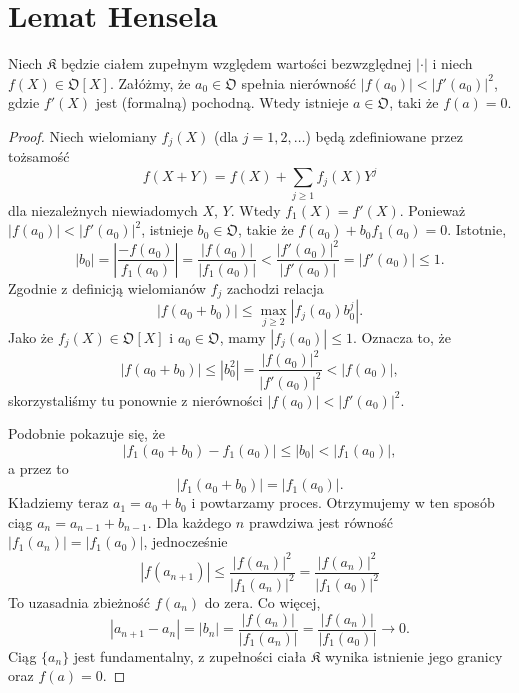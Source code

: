 \chapter{Lemat Hensela}

\begin{twierdzenie}
	Niech $\mathfrak K$ będzie ciałem zupełnym względem wartości bezwzględnej $|\cdot|$ i niech $f(X) \in \mathfrak O[X]$.
	Załóżmy, że $a_0 \in \mathfrak O$ spełnia nierówność $|f(a_0)| < |f'(a_0)|^2$, gdzie $f'(X)$ jest (formalną) pochodną.
	Wtedy istnieje $a \in \mathfrak O$, taki że $f(a) = 0$.
\end{twierdzenie}

\begin{proof}
	Niech wielomiany $f_j(X)$ (dla $j = 1, 2, \ldots$) będą zdefiniowane przez tożsamość
	\[
		f(X + Y) = f(X) + \sum_{j \ge 1} f_j(X) Y^j
	\]
	dla niezależnych niewiadomych $X$, $Y$.
	Wtedy $f_1(X) = f'(X)$.
	Ponieważ $|f(a_0)| < |f'(a_0)|^2$, istnieje $b_0 \in \mathfrak O$, takie że $f(a_0) + b_0 f_1(a_0) = 0$.
	Istotnie,
	\[
		|b_0| = \left|\frac{- f(a_0)}{f_1(a_0)} \right| = \frac{|f(a_0)|}{|f_1(a_0)|} < \frac{|f'(a_0)|^2}{|f'(a_0)|} = |f'(a_0)| \le 1.
	\]
	Zgodnie z definicją wielomianów $f_j$ zachodzi relacja
	\[
		|f(a_0 + b_0)| \le \max_{j \ge 2} |f_j(a_0) b_0^j|.
	\]
	Jako że $f_j(X) \in \mathfrak O[X]$ i $a_0 \in \mathfrak O$, mamy $|f_j(a_0)| \le 1$.
	Oznacza to, że 
	\[
		|f(a_0 + b_0)| \le |b_0^2| = \frac{|f(a_0)|^2}{|f'(a_0)|^2} < |f(a_0)|,
	\]
	skorzystaliśmy tu ponownie z nierówności $|f(a_0)| < |f'(a_0)|^2$.

	Podobnie pokazuje się, że
	\[
		|f_1(a_0 + b_0) - f_1(a_0)| \le |b_0| < |f_1(a_0)|,
	\]
	a przez to
	\[
		|f_1(a_0 + b_0)| = |f_1(a_0)|.
	\]
	Kładziemy teraz $a_1 = a_0 + b_0$ i powtarzamy proces.
	Otrzymujemy w ten sposób ciąg $a_n = a_{n- 1} + b_{n- 1}$.
	Dla każdego $n$ prawdziwa jest równość $|f_1(a_n)| = |f_1(a_0)|$, jednocześnie
	\[
		|f(a_{n+1})| \le \frac{|f(a_n)|^2}{|f_1(a_n)|^2} = \frac{|f(a_n)|^2}{|f_1(a_0)|^2} %
	\]
	To uzasadnia zbieżność $f(a_n)$ do zera.
	Co więcej,
	\[
		|a_{n+1} - a_n| = |b_n| = \frac{|f(a_n)|}{|f_1(a_n)|} = \frac{|f(a_n)|}{|f_1(a_0)|} \to 0.
	\]
	Ciąg $\{a_n\}$ jest fundamentalny, z zupełności ciała $\mathfrak K$ wynika istnienie jego granicy oraz $f(a) = 0$.
\end{proof}